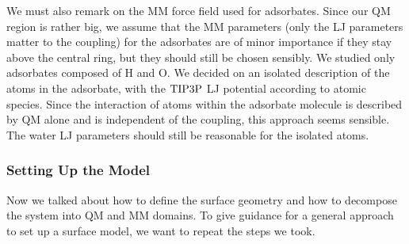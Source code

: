 We must also remark on the MM force field used for adsorbates. Since our QM
region is rather big, we assume that the MM parameters (only the LJ parameters
matter to the coupling) for the adsorbates are of minor importance if they stay
above the central ring, but they should still be chosen sensibly. We studied
only adsorbates composed of H and O. We decided on an isolated description of
the atoms in the adsorbate, with the $\text{TIP3P}$ LJ potential according to atomic
species. Since the interaction of atoms within the adsorbate molecule is
described by QM alone and is independent of the coupling, this approach seems
sensible. The water LJ parameters should still be reasonable for the isolated
atoms.

\subsubsection{Setting Up the Model}

Now we talked about how to define the surface geometry and how to decompose
the system into QM and MM domains. To give guidance for a general approach to
set up a surface model, we want to repeat the steps we took.

